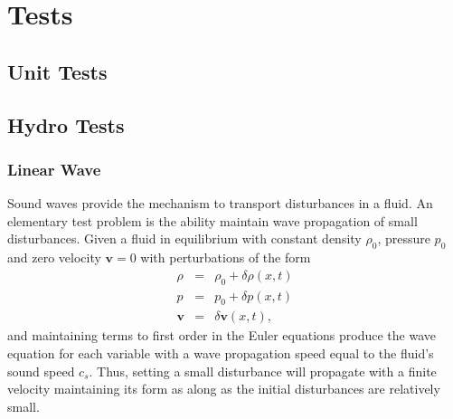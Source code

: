\section{Tests}
\subsection{Unit Tests}

\subsection{Hydro Tests}
\subsubsection{Linear Wave}
Sound waves provide the mechanism to transport disturbances in a fluid. An
elementary test problem is the ability maintain wave propagation of small
disturbances. Given a fluid in equilibrium with constant density $\rho_0$,
pressure $p_0$ and zero velocity $\mathbf{v}=0$ with perturbations of the form
\begin{equation}
	\begin{array}{rcl}
		\rho & = & \rho_0 + \delta\rho(x,t) \\
   		 p & = & p_0 + \delta p(x,t) \\
    	\mathbf{v} & = & \delta\mathbf{v}(x,t),
    \end{array}
\end{equation}
and maintaining terms to first order in the Euler equations produce the wave
equation for each variable with a wave propagation speed equal to the fluid's sound speed 
$c_s$. Thus, setting a small disturbance 
will propagate with a finite velocity maintaining its form as along as the initial
disturbances are relatively small.

